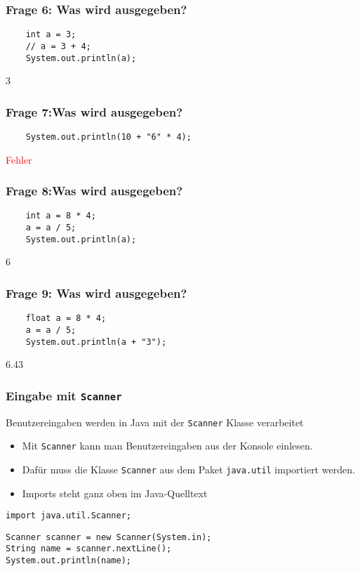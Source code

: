 \documentclass{../../presentation}
\begin{document}
\begin{frame}[fragile]
  \frametitle{Frage 6: Was wird ausgegeben?}
  \begin{verbatim}
    int a = 3;
    // a = 3 + 4;
    System.out.println(a);
  \end{verbatim}
  \pause
  \begin{ausgabe}
    3
  \end{ausgabe}
\end{frame}

\begin{frame}[fragile]
  \frametitle{Frage 7:Was wird ausgegeben?}
  \begin{verbatim}
    System.out.println(10 + "6" * 4);
  \end{verbatim}
  \pause
  \begin{ausgabe}
    \textcolor{red}{Fehler}
  \end{ausgabe}
\end{frame}

\begin{frame}[fragile]
  \frametitle{Frage 8:Was wird ausgegeben?}
  \begin{verbatim}
    int a = 8 * 4;
    a = a / 5;
    System.out.println(a);
  \end{verbatim}
  \pause
  \begin{ausgabe}
    6
  \end{ausgabe}
\end{frame}

\begin{frame}[fragile]
  \frametitle{Frage 9: Was wird ausgegeben?}
  \begin{verbatim}
    float a = 8 * 4;
    a = a / 5;
    System.out.println(a + "3");
  \end{verbatim}
  \pause
  \begin{ausgabe}
    6.43
  \end{ausgabe}
\end{frame}

\begin{frame}[fragile]
  \frametitle{Eingabe mit \texttt{Scanner}}
  \pause
  Benutzereingaben werden in Java mit der \texttt{Scanner} Klasse verarbeitet
  \pause
  \begin{itemize}
    \item Mit \texttt{Scanner} kann man Benutzereingaben aus der Konsole einlesen.
          \pause
    \item Dafür muss die Klasse \texttt{Scanner} aus dem Paket \texttt{java.util} importiert werden.
          \pause
    \item Imports steht ganz oben im Java-Quelltext
  \end{itemize}
  \pause
  \begin{verbatim}
import java.util.Scanner;
\end{verbatim}
  \pause
  \begin{verbatim}
Scanner scanner = new Scanner(System.in);
String name = scanner.nextLine();
System.out.println(name);
  \end{verbatim}
\end{frame}
\end{document}
